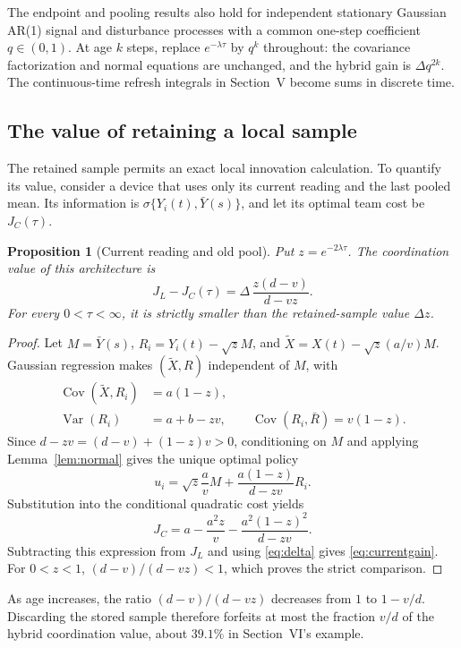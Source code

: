 \documentclass[letterpaper,10pt,conference]{ieeeconf}
\newtheorem{proposition}{Proposition}
\newcommand{\Var}{\operatorname{Var}}
\newcommand{\Cov}{\operatorname{Cov}}
\begin{document}
The endpoint and pooling results also hold for independent stationary Gaussian AR(1) signal and disturbance processes with a common one-step coefficient $q\in(0,1)$. At age $k$ steps, replace $e^{-\lambda\tau}$ by $q^k$ throughout: the covariance factorization and normal equations are unchanged, and the hybrid gain is $\Delta q^{2k}$. The continuous-time refresh integrals in Section~V become sums in discrete time.

\subsection{The value of retaining a local sample}\label{subsec:memory}
The retained sample permits an exact local innovation calculation. To quantify its value, consider a device that uses only its current reading and the last pooled mean. Its information is $\sigma\{Y_i(t),\bar Y(s)\}$, and let its optimal team cost be $J_C(\tau)$.
\begin{proposition}[Current reading and old pool]\label{prop:current}
Put $z=e^{-2\lambda\tau}$. The coordination value of this architecture is
\begin{equation}
 J_L-J_C(\tau)=\Delta\,\frac{z(d-v)}{d-vz}.\label{eq:currentgain}
\end{equation}
For every $0<\tau<\infty$, it is strictly smaller than the retained-sample value $\Delta z$.
\end{proposition}
\begin{proof}
Let $M=\bar Y(s)$, $R_i=Y_i(t)-\sqrt zM$, and $\widetilde X=X(t)-\sqrt z(a/v)M$. Gaussian regression makes $(\widetilde X,R)$ independent of $M$, with
\begin{align*}
 \Cov(\widetilde X,R_i)&=a(1-z),\\
 \Var(R_i)&=a+b-zv,\qquad
 \Cov(R_i,\bar R)=v(1-z).
\end{align*}
Since $d-zv=(d-v)+(1-z)v>0$, conditioning on $M$ and applying Lemma~\ref{lem:normal} gives the unique optimal policy
\begin{equation}
 u_i=\sqrt z\frac avM+\frac{a(1-z)}{d-zv}R_i.\label{eq:currentpolicy}
\end{equation}
Substitution into the conditional quadratic cost yields
\begin{equation}
 J_C=a-\frac{a^2z}{v}-\frac{a^2(1-z)^2}{d-zv}.\label{eq:currentcost}
\end{equation}
Subtracting this expression from $J_L$ and using \eqref{eq:delta} gives \eqref{eq:currentgain}. For $0<z<1$, $(d-v)/(d-vz)<1$, which proves the strict comparison.
\end{proof}
As age increases, the ratio $(d-v)/(d-vz)$ decreases from $1$ to $1-v/d$. Discarding the stored sample therefore forfeits at most the fraction $v/d$ of the hybrid coordination value, about $39.1\%$ in Section~VI's example.
\end{document}
